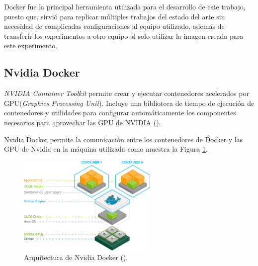 Docker fue la principal herramienta utilizada para el desarrollo de este trabajo, puesto que, sirvió para replicar múltiples trabajos del estado del arte sin necesidad de complicadas configuraciones al equipo utilizado, además de transferir los experimentos a otro equipo al solo utilizar la imagen creada para este experimento.

\subsection{Nvidia Docker}

\textit{NVIDIA Container Toolkit} permite crear y ejecutar contenedores acelerados por GPU(\textit{Graphics Processing Unit}).
Incluye una biblioteca de tiempo de ejecución de contenedores y utilidades para configurar automáticamente los componentes necesarios para aprovechar las GPU de NVIDIA (\cite{nvidiaDocker2021overview}).

Nvidia Docker permite la comunicación entre los contenedores de Docker y las GPU de Nvidia en la máquina utilizada como muestra la Figura \ref{fig:nvidiaDocker}.

\begin{figure}[H]
    \centering
    \includegraphics[width=0.6\textwidth]{MarcoTeorico/imgs/nvidia-docker.png}
    \caption{Arquitectura de Nvidia Docker (\cite{nvidiaDocker2021overview}).}
    \label{fig:nvidiaDocker}
\end{figure}
